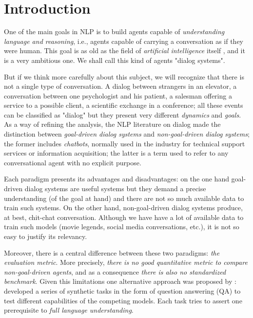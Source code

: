 \chapter{Introduction}
\label{ch:01-introduction}

One of the main goals in NLP is to build agents capable of \textit{understanding language and reasoning}, i.e., agents capable of carrying a conversation as if they were human. This goal is as old as the field of \textit{artificial intelligence} itself \cite{Turing}, and it is a very ambitious one. We shall call this kind of agents "dialog systems".

But if we think more carefully about this subject, we will recognize that there is not a single type of conversation. A dialog between strangers in an elevator, a conversation between one psychologist and his patient, a salesman offering a service to a possible client, a scientific exchange in a conference; all these events can be classified as "dialog" but they present very different \textit{dynamics} and \textit{goals}. As a way of refining the analysis, the NLP literature on dialog made the distinction between \textit{goal-driven dialog systems} and \textit{non-goal-driven dialog systems}; the former includes \textit{chatbots}, normally used in the industry for technical support services or information acquisition; the latter is a term used to refer to any conversational agent with no explicit purpose.

Each paradigm presents its advantages and disadvantages: on the one hand goal-driven dialog systems are useful systems but they demand a precise understanding (of the goal at hand) and there are not so much available data to train such systems. On the other hand, non-goal-driven dialog systems produce, at best, chit-chat conversation. Although we have have a lot of available data to train such models (movie legends, social media conversations, etc.), it is not so easy to justify its relevancy. 

Moreover, there is a central difference between these two paradigms: \textit{the evaluation metric}. More precisely, \textit{there is no good quantitative metric to compare non-goal-driven agents}, and as a consequence \textit{there is also no standardized benchmark}. Given this limitations one alternative approach was proposed by \cite{WestonBCM15}: developed a series of synthetic tasks in the form of question answering (QA) to test different capabilities of the competing models. Each task tries to assert one prerequisite to \textit{full language understanding}.

